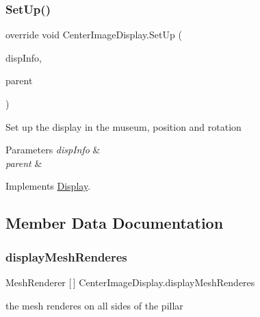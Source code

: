 \subsubsection{\texorpdfstring{Set\+Up()}{SetUp()}}
{\footnotesize\ttfamily override void Center\+Image\+Display.\+Set\+Up (\begin{DoxyParamCaption}\item[{\mbox{\hyperlink{class_museum_display_info}{Museum\+Display\+Info}}}]{disp\+Info,  }\item[{Game\+Object}]{parent }\end{DoxyParamCaption})\hspace{0.3cm}{\ttfamily [virtual]}}



Set up the display in the museum, position and rotation 


\begin{DoxyParams}{Parameters}
{\em disp\+Info} & \\
\hline
{\em parent} & \\
\hline
\end{DoxyParams}


Implements \mbox{\hyperlink{class_display_a57325251fbeac943cd48520e50f0bec4}{Display}}.



\subsection{Member Data Documentation}
\mbox{\label{class_center_image_display_a47f09ee02109c10416288b5022f193f8}} 
\subsubsection{\texorpdfstring{display\+Mesh\+Renderes}{displayMeshRenderes}}
{\footnotesize\ttfamily Mesh\+Renderer \mbox{[}$\,$\mbox{]} Center\+Image\+Display.\+display\+Mesh\+Renderes\hspace{0.3cm}{\ttfamily [private]}}



the mesh renderes on all sides of the pillar 

\mbox{\label{class_center_image_display_af22091d70f8772c7263ad852e3770619}} 
